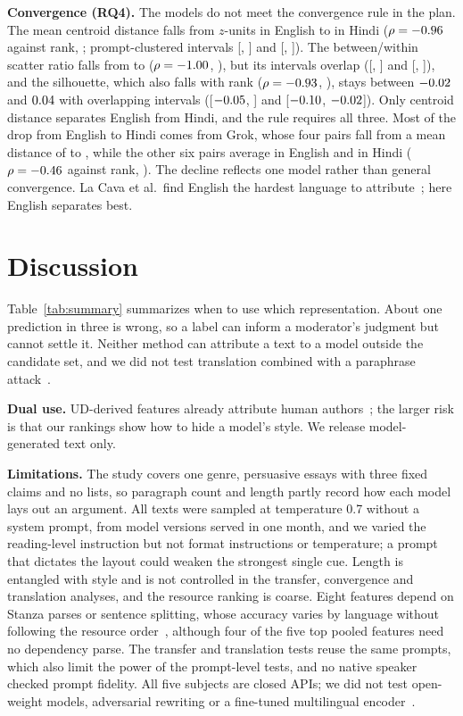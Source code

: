 \documentclass[conference,compsoc]{IEEEtran}
\begin{document}
\textbf{Convergence (RQ4).} The models do not meet the convergence rule in the plan. The mean centroid distance falls from \CentEn{} $z$-units in English to \CentHi{} in Hindi ($\rho = -0.96{}$ against rank, \CentPexact{}; prompt-clustered intervals [\PCCentEnLo{}, \PCCentEnHi{}] and [\PCCentHiLo{}, \PCCentHiHi{}]). The between/within scatter ratio falls from \BWen{} to \BWhi{} ($\rho = -1.00{}$, \BWPexact{}), but its intervals overlap ([\PCBWEnLo{}, \PCBWEnHi{}] and [\PCBWHiLo{}, \PCBWHiHi{}]), and the silhouette, which also falls with rank ($\rho = -0.93{}$, \SilP{}), stays between $-0.02{}$ and $0.04{}$ with overlapping intervals ([$-0.05{}$, \PCSilEnHi{}] and [$-0.10{}$, $-0.02{}$]). Only centroid distance separates English from Hindi, and the rule requires all three. Most of the drop from English to Hindi comes from Grok, whose four pairs fall from a mean distance of \GrokPairsEn{} to \GrokPairsHi{}, while the other six pairs average \OtherPairsEn{} in English and \OtherPairsHi{} in Hindi ($\rho = -0.46{}$ against rank, \OtherPairsPexact{}). The decline reflects one model rather than general convergence. La Cava et al.\ find English the hardest language to attribute~\cite{lacava2026multilingual}; here English separates best.

\section{Discussion}
Table~\ref{tab:summary} summarizes when to use which representation. About one prediction in three is wrong, so a label can inform a moderator's judgment but cannot settle it. Neither method can attribute a text to a model outside the candidate set, and we did not test translation combined with a paraphrase attack~\cite{riverasoto2026attacks}.

\textbf{Dual use.} UD-derived features already attribute human authors~\cite{gorman2022ud}; the larger risk is that our rankings show how to hide a model's style. We release model-generated text only.

\textbf{Limitations.} The study covers one genre, persuasive essays with three fixed claims and no lists, so paragraph count and length partly record how each model lays out an argument. All texts were sampled at temperature 0.7 without a system prompt, from model versions served in one month, and we varied the reading-level instruction but not format instructions or temperature; a prompt that dictates the layout could weaken the strongest single cue. Length is entangled with style and is not controlled in the transfer, convergence and translation analyses, and the resource ranking is coarse. Eight features depend on Stanza parses or sentence splitting, whose accuracy varies by language without following the resource order~\cite{qi2020stanza}, although four of the five top pooled features need no dependency parse. The transfer and translation tests reuse the same \NPrompts{} prompts, which also limit the power of the prompt-level tests, and no native speaker checked prompt fidelity. All five subjects are closed APIs; we did not test open-weight models, adversarial rewriting or a fine-tuned multilingual encoder~\cite{greco2026multighost}.
\end{document}
